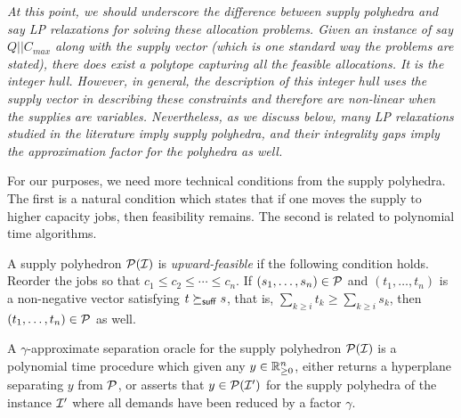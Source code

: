 \begin{remark}\emph{
At this point, we should underscore the difference between supply polyhedra and say LP relaxations for solving  these allocation problems.
Given an instance of say $Q||C_{max}$ {\em along with} the supply vector (which is one standard way the problems are stated), there does exist a polytope capturing all the feasible allocations. It is the integer hull.
However, in general, the description of this integer hull uses the supply vector in describing these constraints and therefore are non-linear when the supplies are variables. Nevertheless, as we discuss below, many LP relaxations
studied in the literature imply supply polyhedra, and their integrality gaps imply the approximation factor for the polyhedra as well.
}
\end{remark}

For our purposes, we need more technical conditions from the supply polyhedra. The first is a natural condition which states that if one moves the supply to higher capacity jobs, then feasibility remains.
The second is related to polynomial time algorithms.

\begin{definition}
	A supply polyhedron ${\cal P}({\cal I})$ is {\em upward-feasible} if the following condition holds.
Reorder the jobs so that $c_1\le c_2 \le \cdots \le c_n$.
		If $(s_1,\ldots,s_n)\in {\cal P}$ and $(t_1,\ldots,t_n)$ is a non-negative vector satisfying $t\succeq_{\mathsf{suff}} s$, that is, $\sum_{k\geq i} t_k \geq \sum_{k\geq i} s_k$, then $(t_1,\ldots,t_n)\in {\cal P}$ as well.
\end{definition}
\begin{definition}
A $\gamma$-approximate separation oracle for the supply polyhedron ${\cal P}({\cal I})$ is a polynomial time procedure which 	given any $y\in \mathbb R^n_{\geq 0}$,  either returns a hyperplane separating $y$ from ${\cal P}$, or asserts that
		$y\in {\cal P}({\cal I}')$ for the supply polyhedra of the instance ${\cal I}'$ where all demands have been reduced by a factor $\gamma$.
\end{definition}
